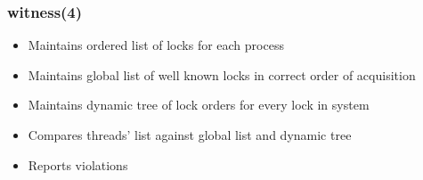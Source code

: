 \documentclass{beamer}
\begin{document}
\begin{frame}
\frametitle{witness(4)}
 {
  \begin{itemize}
    \item {Maintains ordered list of locks for each process}
    \item {Maintains global list of well known locks in correct order
	   of acquisition}
    \item {Maintains dynamic tree of lock orders for every lock in system}
    \item {Compares threads' list against global list and dynamic tree}
    \item {Reports violations}
  \end{itemize}
}
 {
}
\end{frame}
\end{document}
